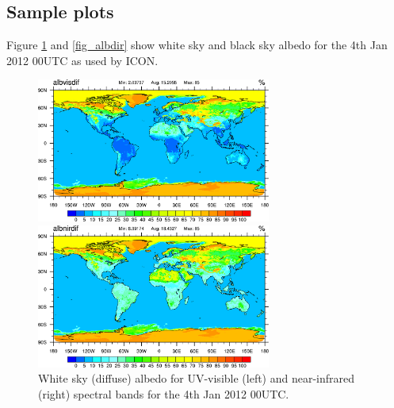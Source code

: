 \documentclass[a4paper,11pt]{article}
\begin{document}
\subsection{Sample plots}
Figure \ref{fig_albdif} and \ref{fig_albdir} show white sky and black sky albedo for the 4th Jan 2012 00UTC as used by ICON. 
\begin{figure}[ht]
\begin{minipage}[t]{\textwidth}
  \begin{minipage}[t]{0.496\textwidth}
    \center
    \includegraphics[width=7.7cm]{albvisdif_20120104_00UTC.png}
  \end{minipage}
  \begin{minipage}[t]{0.496\textwidth}
    \center
    \includegraphics[width=7.7cm]{albnirdif_20120104_00UTC.png}
  \end{minipage}
\end{minipage}
\caption{White sky (diffuse) albedo for UV-visible (left) and near-infrared (right) spectral bands for the 4th Jan 2012 00UTC.}\label{fig_albdif}
\end{figure}
\end{document}
